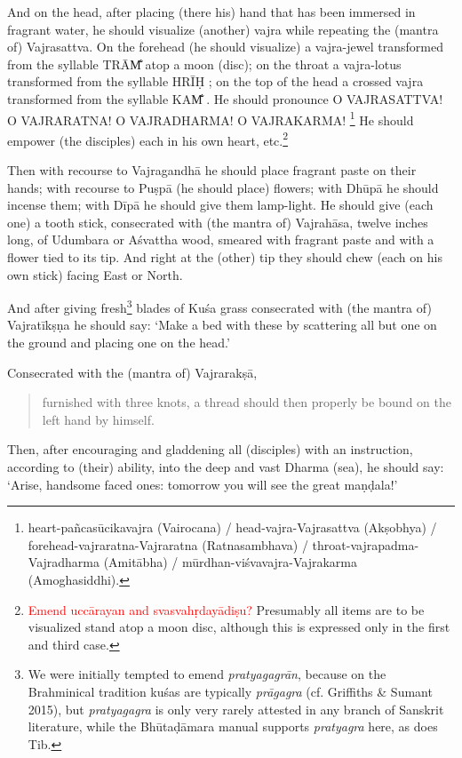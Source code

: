 \documentclass[11pt]{book}
\makeatletter
\def\fakesc#1{%
  \begingroup%
  \xdef\fake@name{\csname\curr@fontshape/\f@size\endcsname}%
  \fontsize{1.3\fontdimen8\fake@name}{\baselineskip}\selectfont%
  \uppercase{#1}%
  \endgroup%
}
\newcommand{\mantra}[1]{\fakesc{#1}}
\newcommand{\red}[1]{\textcolor{red}{#1}}
\newcommand{\skt}[1]{\emph{#1}}
\makeatother
\begin{document}
And on the head, after placing (there his) hand that has been immersed in fragrant water, he should visualize (another) vajra while repeating the (mantra of) Vajrasattva. On the forehead (he should visualize) a vajra-jewel transformed from the syllable \mantra{trām̐} atop a moon (disc); on the throat a vajra-lotus transformed from the syllable \mantra{hrīḥ}; on the top of the head a crossed vajra transformed from the syllable \mantra{kam̐}. He should pronounce \mantra{o vajrasattva! o vajraratna! o vajradharma! o vajrakarma!}\footnote{heart-pañcasūcikavajra (Vairocana) / head-vajra-Vajrasattva (Akṣobhya) / forehead-vajraratna-Vajraratna (Ratnasambhava) / throat-vajrapadma-Vajradharma (Amitābha) / mūrdhan-viśvavajra-Vajrakarma (Amoghasiddhi).} He should empower (the disciples) each in his own heart, etc.\footnote{\red{Emend uccārayan and svasvahṛdayādiṣu?} Presumably all items are to be visualized stand atop a moon disc, although this is expressed only in the first and third case.}

Then with recourse to Vajragandhā he should place fragrant paste on their hands; with recourse to Puṣpā (he should place) flowers; with Dhūpā he should incense them; with Dīpā he should give them lamp-light. He should give (each one) a tooth stick, consecrated with (the mantra of) Vajrahāsa, twelve inches long, of Udumbara or Aśvattha wood, smeared with fragrant paste and with a flower tied to its tip. And right at the (other) tip they should chew (each on his own stick) facing East or North.

And after giving fresh\footnote{We were initially tempted to emend \skt{pratyagagrān}, because on the Brahminical tradition kuśas are typically \skt{prāgagra} (cf. Griffiths \& Sumant 2015), but \skt{pratyagagra} is only very rarely attested in any branch of Sanskrit literature, while the Bhūtaḍāmara manual supports \skt{pratyagra} here, as does Tib.} blades of Kuśa grass consecrated with (the mantra of) Vajratīkṣṇa he should say: `Make a bed with these by scattering all but one on the ground and placing one on the head.' 

Consecrated with the (mantra of) Vajrarakṣā,

\begin{verse}
furnished with three knots, a thread should then properly be bound on the left hand by himself.
\end{verse}

Then, after encouraging and gladdening all (disciples) with an instruction, according to (their) ability, into the deep and vast Dharma (sea), he should say: `Arise, handsome faced ones: tomorrow you will see the great maṇḍala!'
\end{document}

